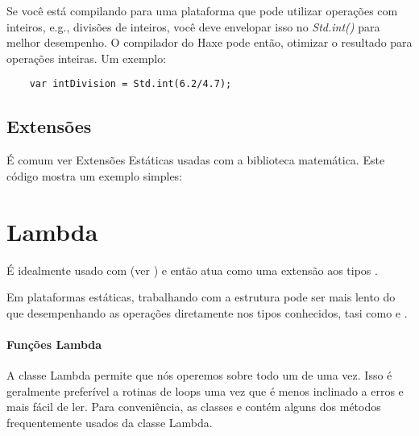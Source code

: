 {Se você está compilando para uma plataforma que pode utilizar operações com inteiros, e.g., divisões de inteiros, você deve envelopar isso no \emph{Std.int()} para melhor desempenho. O compilador do Haxe pode então, otimizar o resultado para operações inteiras. Um exemplo:

\begin{lstlisting}
	var intDivision = Std.int(6.2/4.7);
\end{lstlisting}

\subsection{Extensões}
\label{std-math-extensions}

É comum ver Extensões Estáticas  usadas com a biblioteca matemática. Este código mostra um exemplo simples:


\section{Lambda}
\label{std-Lambda}


É idealmente usado com  (ver ) e então atua como uma extensão aos tipos .

Em plataformas estáticas, trabalhando com a estrutura  pode ser mais lento do que desempenhando as operações diretamente nos tipos conhecidos, tasi como  e .

\paragraph{Funções Lambda}

A classe Lambda permite que nós operemos sobre todo um  de uma vez.
Isso é geralmente preferível a rotinas de loops uma vez que é menos inclinado a erros e mais fácil de ler.
Para conveniência, as classes  e  contém alguns dos métodos frequentemente usados da classe Lambda.

}
